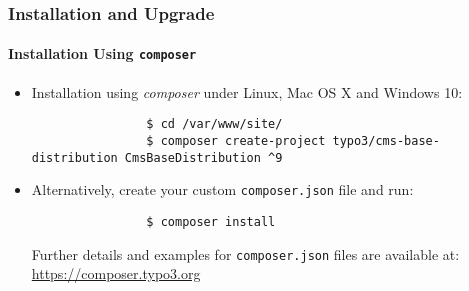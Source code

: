 \begin{frame}[fragile]
	\frametitle{Installation and Upgrade}
	\framesubtitle{Installation Using \texttt{composer}}

	\lstset{basicstyle=\tiny\ttfamily}

	\begin{itemize}
		\item Installation using \textit{composer} under Linux, Mac OS X and Windows 10:

			\begin{lstlisting}
				$ cd /var/www/site/
				$ composer create-project typo3/cms-base-distribution CmsBaseDistribution ^9
			\end{lstlisting}

		\item Alternatively, create your custom \texttt{composer.json} file and run:

			\begin{lstlisting}
				$ composer install
			\end{lstlisting}

			Further details and examples for \texttt{composer.json} files are available at:\newline
			\smaller
				\href{https://composer.typo3.org}{https://composer.typo3.org}
			\normalsize

	\end{itemize}
\end{frame}


